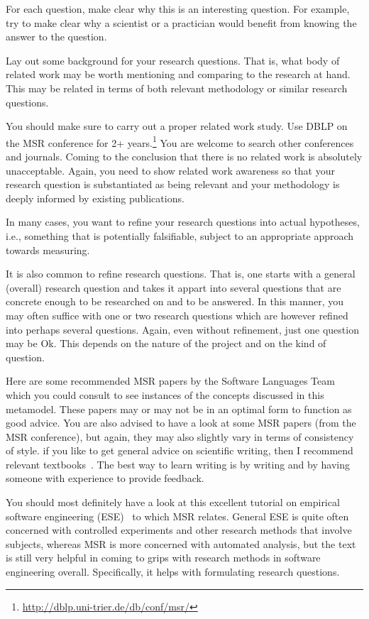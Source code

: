 \documentclass{llncs}
\begin{document}
For each question, make clear why this is an interesting question. For
example, try to make clear why a scientist or a practician would
benefit from knowing the answer to the question.

Lay out some background for your research questions. That is, what
body of related work may be worth mentioning and comparing to the
research at hand. This may be related in terms of both relevant
methodology or similar research questions.

You should make sure to carry out a proper related work study. Use
DBLP on the MSR conference for 2+
years.\footnote{\url{http://dblp.uni-trier.de/db/conf/msr/}} You are
welcome to search other conferences and journals. Coming to the
conclusion that there is no related work is absolutely
unacceptable. Again, you need to show related work awareness so that
your research question is substantiated as being relevant and
your methodology is deeply informed by existing publications.

In many cases, you want to refine your research questions into actual
hypotheses, i.e., something that is potentially falsifiable, subject
to an appropriate approach towards measuring.

It is also common to refine research questions. That is, one starts
with a general (overall) research question and takes it appart into
several questions that are concrete enough to be researched on and to
be answered. In this manner, you may often suffice with one or two
research questions which are however refined into perhaps
several questions. Again, even without refinement, just one question may be
Ok. This depends on the nature of the project and on the kind of question.

Here are some recommended MSR papers by the Software Languages
Team~\cite{LaemmelLPV11,LaemmelP13,SchmorleizL15} which you could
consult to see instances of the concepts discussed in this
metamodel. These papers may or may not be in an optimal form to
function as good advice. You are also advised to have a look at some
MSR papers (from the MSR conference), but again, they may also
slightly vary in terms of consistency of style. if you like to get
general advice on scientific writing, then I recommend relevant
textbooks~\cite{Day98,Zobel09}. The best way to learn writing is by
writing and by having someone with experience to provide feedback.

You should most definitely have a look at this excellent tutorial on
empirical software engineering (ESE)~\cite{Easterbrook07} to which MSR
relates. General ESE is quite often concerned with controlled
experiments and other research methods that involve subjects, whereas
MSR is more concerned with automated analysis, but the text is still
very helpful in coming to grips with research methods in software
engineering overall. Specifically, it helps with formulating research questions.
\end{document}
